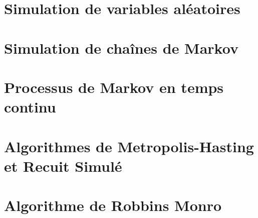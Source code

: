 



\chapter{Simulation de variables aléatoires}


\chapter{Simulation de chaînes de Markov}


\chapter{Processus de Markov en temps continu}


\chapter{Algorithmes de Metropolis-Hasting et Recuit Simulé}


\chapter{Algorithme de Robbins Monro}


